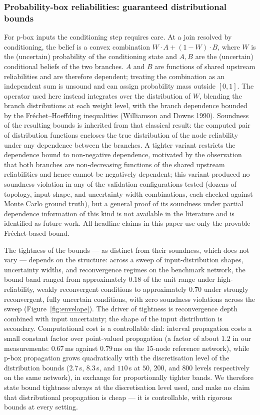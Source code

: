 \documentclass[preprint,12pt]{elsarticle}
\theoremstyle{definition}
\begin{document}
\subsubsection{Probability-box reliabilities: guaranteed distributional bounds}\label{sec:pbox}

For p-box inputs the conditioning step requires care. At a join resolved by conditioning, the belief is
a convex combination $W\cdot A+(1-W)\cdot B$, where $W$ is the (uncertain) probability of the
conditioning state and $A,B$ are the (uncertain) conditional beliefs of the two branches. $A$ and $B$
are functions of shared upstream reliabilities and are therefore dependent; treating the combination as
an independent sum is unsound and can assign probability mass outside $[0,1]$. The operator used here
instead integrates over the distribution of $W$, blending the branch distributions at each weight level,
with the branch dependence bounded by the Fr\'echet--Hoeffding inequalities (Williamson and Downs 1990).
Soundness of the resulting bounds is inherited from that classical result: the computed pair of
distribution functions encloses the true distribution of the node reliability under any dependence
between the branches. A tighter variant restricts the dependence bound to non-negative dependence,
motivated by the observation that both branches are non-decreasing functions of the shared upstream
reliabilities and hence cannot be negatively dependent; this variant produced no soundness violation in
any of the validation configurations tested (dozens of topology, input-shape, and uncertainty-width
combinations, each checked against Monte Carlo ground truth), but a general proof of its soundness under
partial dependence information of this kind is not available in the literature and is identified as
future work. All headline claims in this paper use only the provable Fr\'echet-based bound.

The tightness of the bounds --- as distinct from their soundness, which does not vary --- depends on the
structure: across a sweep of input-distribution shapes, uncertainty widths, and reconvergence regimes on
the benchmark network, the bound band ranged from approximately $0.18$ of the unit range under
high-reliability, weakly reconvergent conditions to approximately $0.70$ under strongly reconvergent,
fully uncertain conditions, with zero soundness violations across the sweep (Figure~\ref{fig:envelope}).
The driver of tightness is reconvergence depth combined with input uncertainty; the shape of the input
distribution is secondary. Computational cost is a controllable dial: interval propagation costs a small
constant factor over point-valued propagation (a factor of about $1.2$ in our measurements: $0.67$\,ms
against $0.79$\,ms on the 15-node reference network), while p-box propagation grows quadratically with
the discretisation level of the distribution bounds ($2.7$\,s, $8.3$\,s, and $110$\,s at $50$, $200$,
and $800$ levels respectively on the same network), in exchange for proportionally tighter bands. We
therefore state bound tightness always at the discretisation level used, and make no claim that
distributional propagation is cheap --- it is controllable, with rigorous bounds at every setting.
\end{document}

